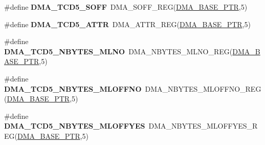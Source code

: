 \begin{DoxyCompactItemize}
\item 
\hypertarget{group___d_m_a___register___accessor___macros_ga299ca77e3ea01fa9a38285be053705e0}{}\#define {\bfseries D\+M\+A\+\_\+\+T\+C\+D5\+\_\+\+S\+O\+F\+F}~D\+M\+A\+\_\+\+S\+O\+F\+F\+\_\+\+R\+E\+G(\hyperlink{group___d_m_a___peripheral_ga6997fbc1b1973e9f27170217a3bd6f22}{D\+M\+A\+\_\+\+B\+A\+S\+E\+\_\+\+P\+T\+R},5)\label{group___d_m_a___register___accessor___macros_ga299ca77e3ea01fa9a38285be053705e0}

\item 
\hypertarget{group___d_m_a___register___accessor___macros_ga731feb22fa7733ad23173ed440d37836}{}\#define {\bfseries D\+M\+A\+\_\+\+T\+C\+D5\+\_\+\+A\+T\+T\+R}~D\+M\+A\+\_\+\+A\+T\+T\+R\+\_\+\+R\+E\+G(\hyperlink{group___d_m_a___peripheral_ga6997fbc1b1973e9f27170217a3bd6f22}{D\+M\+A\+\_\+\+B\+A\+S\+E\+\_\+\+P\+T\+R},5)\label{group___d_m_a___register___accessor___macros_ga731feb22fa7733ad23173ed440d37836}

\item 
\hypertarget{group___d_m_a___register___accessor___macros_gac5b5c66904988988e6cadca4fb8428f2}{}\#define {\bfseries D\+M\+A\+\_\+\+T\+C\+D5\+\_\+\+N\+B\+Y\+T\+E\+S\+\_\+\+M\+L\+N\+O}~D\+M\+A\+\_\+\+N\+B\+Y\+T\+E\+S\+\_\+\+M\+L\+N\+O\+\_\+\+R\+E\+G(\hyperlink{group___d_m_a___peripheral_ga6997fbc1b1973e9f27170217a3bd6f22}{D\+M\+A\+\_\+\+B\+A\+S\+E\+\_\+\+P\+T\+R},5)\label{group___d_m_a___register___accessor___macros_gac5b5c66904988988e6cadca4fb8428f2}

\item 
\hypertarget{group___d_m_a___register___accessor___macros_ga8751f24b9f2e3d213a219e5b42f9e642}{}\#define {\bfseries D\+M\+A\+\_\+\+T\+C\+D5\+\_\+\+N\+B\+Y\+T\+E\+S\+\_\+\+M\+L\+O\+F\+F\+N\+O}~D\+M\+A\+\_\+\+N\+B\+Y\+T\+E\+S\+\_\+\+M\+L\+O\+F\+F\+N\+O\+\_\+\+R\+E\+G(\hyperlink{group___d_m_a___peripheral_ga6997fbc1b1973e9f27170217a3bd6f22}{D\+M\+A\+\_\+\+B\+A\+S\+E\+\_\+\+P\+T\+R},5)\label{group___d_m_a___register___accessor___macros_ga8751f24b9f2e3d213a219e5b42f9e642}

\item 
\hypertarget{group___d_m_a___register___accessor___macros_ga2c2dc1bbc567fb9b81593ca3e926089b}{}\#define {\bfseries D\+M\+A\+\_\+\+T\+C\+D5\+\_\+\+N\+B\+Y\+T\+E\+S\+\_\+\+M\+L\+O\+F\+F\+Y\+E\+S}~D\+M\+A\+\_\+\+N\+B\+Y\+T\+E\+S\+\_\+\+M\+L\+O\+F\+F\+Y\+E\+S\+\_\+\+R\+E\+G(\hyperlink{group___d_m_a___peripheral_ga6997fbc1b1973e9f27170217a3bd6f22}{D\+M\+A\+\_\+\+B\+A\+S\+E\+\_\+\+P\+T\+R},5)\label{group___d_m_a___register___accessor___macros_ga2c2dc1bbc567fb9b81593ca3e926089b}


\end{DoxyCompactItemize}
